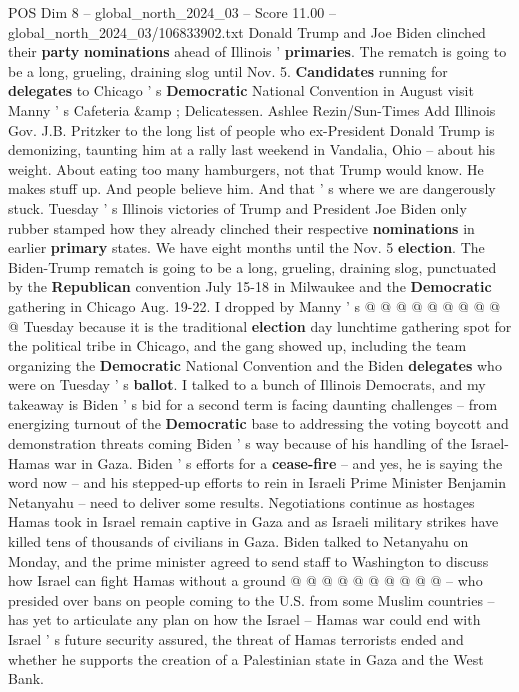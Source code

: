 \begin{textsample}{POS Dim 8 – global\_north\_2024\_03 – Score 11.00 – global\_north\_2024\_03/106833902.txt}  \label{ex:f8_pos_018}
Donald Trump and Joe Biden clinched their \textbf{party} \textbf{nominations} ahead of Illinois ' \textbf{primaries}.
The rematch is going to be a long, grueling, draining slog until Nov. 5. \textbf{Candidates} running for \textbf{delegates} to Chicago ' s \textbf{Democratic} National Convention in August visit Manny ' s Cafeteria \&amp ; Delicatessen.
Ashlee Rezin/Sun-Times Add Illinois Gov.
J.B.
Pritzker to the long list of people who ex-President Donald Trump is demonizing, taunting him at a rally last weekend in Vandalia, Ohio -- about his weight.
About eating too many hamburgers, not that Trump would know.
He makes stuff up.
And people believe him.
And that ' s where we are dangerously stuck.
Tuesday ' s Illinois victories of Trump and President Joe Biden only rubber stamped how they already clinched their respective \textbf{nominations} in earlier \textbf{primary} states.
We have eight months until the Nov. 5 \textbf{election}.
The Biden-Trump rematch is going to be a long, grueling, draining slog, punctuated by the \textbf{Republican} convention July 15-18 in Milwaukee and the \textbf{Democratic} gathering in Chicago Aug. 19-22.
I dropped by Manny ' s @ @ @ @ @ @ @ @ @ @ Tuesday because it is the traditional \textbf{election} day lunchtime gathering spot for the political tribe in Chicago, and the gang showed up, including the team organizing the \textbf{Democratic} National Convention and the Biden \textbf{delegates} who were on Tuesday ' s \textbf{ballot}.
I talked to a bunch of Illinois Democrats, and my takeaway is Biden ' s bid for a second term is facing daunting challenges -- from energizing turnout of the \textbf{Democratic} base to addressing the voting boycott and demonstration threats coming Biden ' s way because of his handling of the Israel-Hamas war in Gaza.
Biden ' s efforts for a \textbf{cease-fire} -- and yes, he is saying the word now -- and his stepped-up efforts to rein in Israeli Prime Minister Benjamin Netanyahu -- need to deliver some results.
Negotiations continue as hostages Hamas took in Israel remain captive in Gaza and as Israeli military strikes have killed tens of thousands of civilians in Gaza.
Biden talked to Netanyahu on Monday, and the prime minister agreed to send staff to Washington to discuss how Israel can fight Hamas without a ground @ @ @ @ @ @ @ @ @ @ -- who presided over bans on people coming to the U.S. from some Muslim countries -- has yet to articulate any plan on how the Israel -- Hamas war could end with Israel ' s future security assured, the threat of Hamas terrorists ended and whether he supports the creation of a Palestinian state in Gaza and the West Bank.

\end{textsample}
